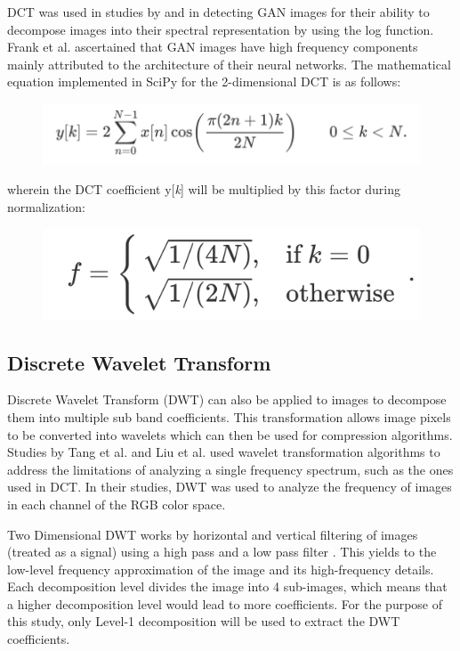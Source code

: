 \documentclass{icsthesis}
\begin{document}
\begin{mainmatter}
DCT was used in studies by \cite{lev-freq-dct} and \cite{fighting-dct} in detecting GAN images for their ability to decompose images into their spectral representation by using the log function. Frank et al. ascertained that GAN images have high frequency components mainly attributed to the architecture of their neural networks. The mathematical equation implemented in SciPy for the 2-dimensional DCT is as follows:

\begin{figure}[ht]
    \centering
    \includegraphics{imgs/formula.png}
\end{figure}

wherein the DCT coefficient y[\textit{k}] will be multiplied by this factor during normalization:

\begin{figure}[ht]
    \centering
    \includegraphics{imgs/factor.png}
\end{figure}


\subsection{Discrete Wavelet Transform}
Discrete Wavelet Transform (DWT) can also be applied to images to decompose them into multiple sub band coefficients. This transformation allows image pixels to be converted into wavelets which can then be used for compression algorithms. Studies by Tang et al. and Liu et al. used wavelet transformation algorithms to address the limitations of analyzing a single frequency spectrum, such as the ones used in DCT. In their studies, DWT was used to analyze the frequency of images in each channel of the RGB color space.

Two Dimensional DWT works by horizontal and vertical filtering of images (treated as a signal) using a high pass and a low pass filter \citep{dwt-method}. This yields to the low-level frequency approximation of the image and its high-frequency details. Each decomposition level divides the image into 4 sub-images, which means that a higher decomposition level would lead to more coefficients. For the purpose of this study, only Level-1 decomposition will be used to extract the DWT coefficients.


\end{mainmatter}
\end{document}
